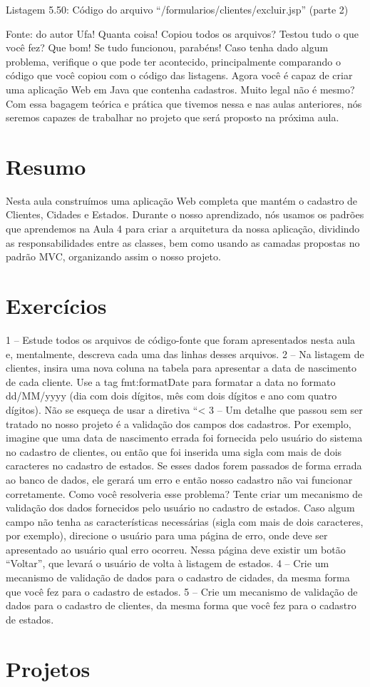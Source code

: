 Listagem 5.50: Código do arquivo “/formularios/clientes/excluir.jsp” (parte 2)
 
Fonte: do autor
Ufa! Quanta coisa! Copiou todos os arquivos? Testou tudo o que você fez? Que bom! Se tudo funcionou, parabéns! Caso tenha dado algum problema, verifique o que pode ter acontecido, principalmente comparando o código que você copiou com o código das listagens. Agora você é capaz de criar uma aplicação Web em Java que contenha cadastros. Muito legal não é mesmo? Com essa bagagem teórica e prática que tivemos nessa e nas aulas anteriores, nós seremos capazes de trabalhar no projeto que será proposto na próxima aula.


\section{Resumo}

Nesta aula construímos uma aplicação Web completa que mantém o cadastro de Clientes, Cidades e Estados. Durante o nosso aprendizado, nós usamos os padrões que aprendemos na Aula 4 para criar a arquitetura da nossa aplicação, dividindo as responsabilidades entre as classes, bem como usando as camadas propostas no padrão MVC, organizando assim o nosso projeto. 

\section{Exercícios}

1 – Estude todos os arquivos de código-fonte que foram apresentados nesta aula e, mentalmente, descreva cada uma das linhas desses arquivos.
2 – Na listagem de clientes, insira uma nova coluna na tabela para apresentar a data de nascimento de cada cliente. Use a tag fmt:formatDate para formatar a data no formato dd/MM/yyyy (dia com dois dígitos, mês com dois dígitos e ano com quatro dígitos). Não se esqueça de usar a diretiva “<%
3 – Um detalhe que passou sem ser tratado no nosso projeto é a validação dos campos dos cadastros. Por exemplo, imagine que uma data de nascimento errada foi fornecida pelo usuário do sistema no cadastro de clientes, ou então que foi inserida uma sigla com mais de dois caracteres no cadastro de estados. Se esses dados forem passados de forma errada ao banco de dados, ele gerará um erro e então nosso cadastro não vai funcionar corretamente. Como você resolveria esse problema? Tente criar um mecanismo de validação dos dados fornecidos pelo usuário no cadastro de estados. Caso algum campo não tenha as características necessárias (sigla com mais de dois caracteres, por exemplo), direcione o usuário para uma página de erro, onde deve ser apresentado ao usuário qual erro ocorreu. Nessa página deve existir um botão “Voltar”, que levará o usuário de volta à listagem de estados.
4 – Crie um mecanismo de validação de dados para o cadastro de cidades, da mesma forma que você fez para o cadastro de estados.
5 – Crie um mecanismo de validação de dados para o cadastro de clientes, da mesma forma que você fez para o cadastro de estados.


\section{Projetos}